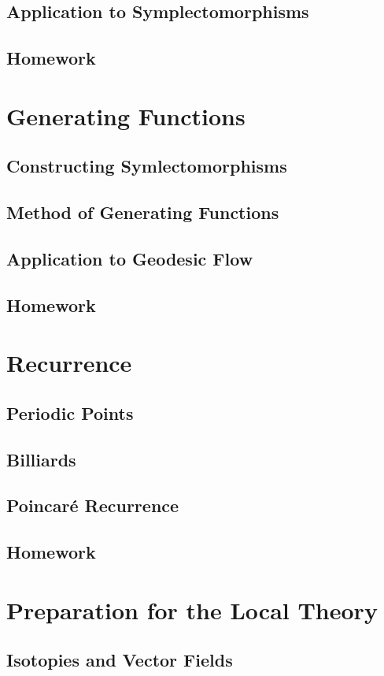 \documentclass[4paper]{article}
\begin{document}
\subsection{Application to Symplectomorphisms}
\subsection{Homework}
\section{Generating Functions}
\subsection{Constructing Symlectomorphisms}
\subsection{Method of Generating Functions}
\subsection{Application to Geodesic Flow}
\subsection{Homework}
\section{Recurrence}
\subsection{Periodic Points}
\subsection{Billiards}
\subsection{Poincar\'{e} Recurrence}
\subsection{Homework}
\section{Preparation for the Local Theory}
\subsection{Isotopies and Vector Fields}
\end{document}
